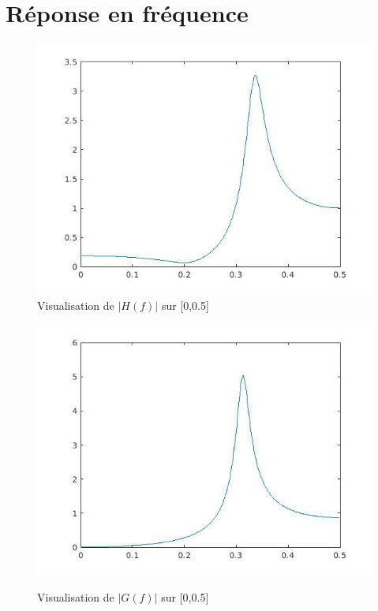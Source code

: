 \documentclass[12,french]{report}
\begin{document}
\section{Réponse en fréquence}

\begin{figure}[H]
    \begin{minipage}[c]{.50\linewidth}
        \centering
        \includegraphics[width=1\textwidth]{./Images/freqz_H}\\
        \caption{Visualisation de $|H(f)|$ sur [0,0.5]}
    \end{minipage}
    \hfill%
    \begin{minipage}[c]{.50\linewidth}
        \centering
        \includegraphics[width=1\textwidth]{./Images/freqz_G}\\
        \caption{Visualisation de $|G(f)|$ sur [0,0.5]}
    \end{minipage}
\end{figure}\vspace{0.3cm}
\end{document}

